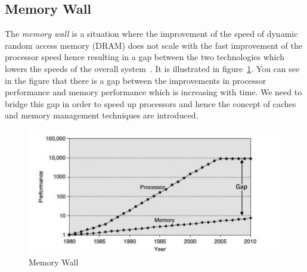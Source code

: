 \documentclass{listhesis}
\begin{document}
\subsection{Memory Wall}
The \textit{memory wall} is a situation where the improvement of the speed of dynamic random access memory (DRAM) does not scale with the fast improvement of the processor speed hence resulting in a gap between the two technologies which lowers the speeds of the overall system~\cite{memorywall}. It is illustrated in figure~\ref{fig:memorywall}. You can see in the figure that there is a gap between the improvements in processor performance and memory performance which is increasing with time. We need to bridge this gap in order to speed up processors and hence the concept of caches and memory management techniques are introduced.\\
\begin{figure}[h!]
  \includegraphics[width=\linewidth]{memorywall.png}
  \centering
  \caption{Memory Wall~\cite{hennessy}}
  \label{fig:memorywall}
\end{figure}
\end{document}
